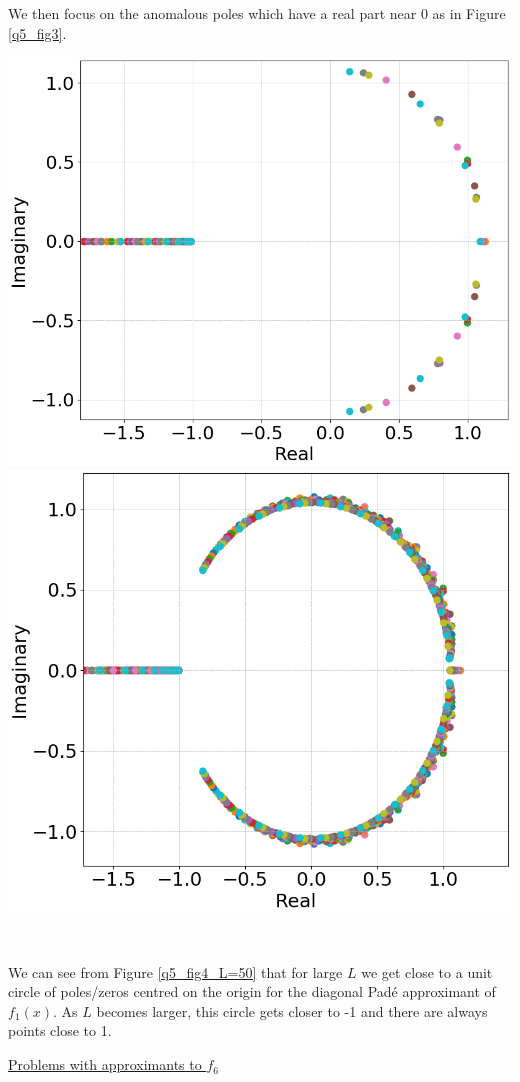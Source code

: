 \documentclass[12pt, a4paper]{article}
\begin{document}
\vspace{0.2cm}

We then focus on the anomalous poles which have a real part near 0 as in Figure \ref{q5_fig3}.

\vspace{0.3cm}
\begin{minipage}{\textwidth}
	\centering
	\includegraphics[width=0.51\linewidth]{q5_fig4_L=20}
	\includegraphics[width=0.48\linewidth]{q5_fig4_L=50}

	\vspace*{-0.2cm}

	\label{q5_fig4_L=50}
\end{minipage}
\\

\vspace{0.4cm}

We can see from Figure \ref{q5_fig4_L=50} that for large $L$ we get close to a unit circle
of poles/zeros centred on the origin for the diagonal Pad\'e approximant of $f_{1}(x)$.
As $L$ becomes larger, this circle gets closer to -1 and there are always points close to 1.
\\
\newpage{}

\vspace{0.4cm}
\underline{Problems with approximants to $f_{6}$}
\end{document}
